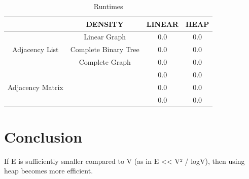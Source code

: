 \documentclass[technote]{IEEEtran}
\begin{document}
\begin{table}[!ht]
    \caption{Runtimes}
    \centering
    \begin{tabular}{|c|c|c|c|}
        \hline
        & DENSITY & LINEAR & HEAP \\ \hline
        \multirow{3}{*}{Adjacency List} 
        & Linear Graph & 0.0 & 0.0 \\ [0.5ex]\cline{2-4}
        & Complete Binary Tree & 0.0 & 0.0 \\ \cline{2-4}
        & Complete Graph & 0.0 & 0.0 \\ \hline
        \multirow{3}{*}{Adjacency Matrix}
        & & 0.0 & 0.0 \\ \cline{2-4}
        & & 0.0 & 0.0 \\ \cline{2-4}
        & & 0.0 & 0.0 \\ \hline
    \end{tabular}
\end{table}







\section{Conclusion}
If  E is sufficiently smaller compared to V (as in E << V² / logV), then using heap becomes more efficient.

\lipsum[1-2]

\nocite{*}


\end{document}
